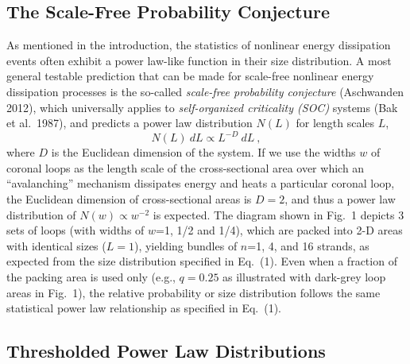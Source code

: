 \documentclass[10pt,preprint]{aastex}  %
\begin{document}
\subsection{	The Scale-Free Probability Conjecture 		}

As mentioned in the introduction, the statistics of nonlinear energy 
dissipation events often exhibit a power law-like function in their 
size distribution. A most general testable prediction
that can be made for scale-free nonlinear energy dissipation processes
is the so-called {\sl scale-free probability conjecture} 
(Aschwanden 2012), which universally applies to {\sl self-organized 
criticality (SOC)} systems (Bak et al.~1987), and predicts a power law 
distribution $N(L)$ for length scales $L$,
\begin{equation}	
	N(L) \ dL \propto L^{-D} \ dL \ ,
\end{equation}
where $D$ is the Euclidean dimension of the system. If we use the
widths $w$ of coronal loops as the length scale of the cross-sectional
area over which an ``avalanching'' mechanism dissipates 
energy and heats a particular coronal loop, the
Euclidean dimension of cross-sectional areas is $D=2$, and thus
a power law distribution of $N(w) \propto w^{-2}$ is expected.
The diagram shown in Fig.~1 depicts
3 sets of loops (with widths of $w$=1, 1/2 and 1/4), which are packed 
into 2-D areas with identical sizes ($L=1$), yielding bundles of
$n$=1, 4, and 16 strands, as expected from the size distribution
specified in Eq.~(1). Even when a fraction of the packing area is
used only (e.g., $q=0.25$ as illustrated with dark-grey loop areas
in Fig.~1), the relative probability or size distribution follows
the same statistical power law relationship as specified in Eq.~(1).

\subsection{	Thresholded Power Law Distributions		}
\end{document}
